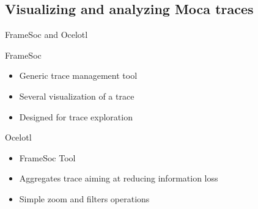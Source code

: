 \documentclass[xcolor={usenames,dvipsnames},hyperref={pdfusetitle}]{beamer}
\begin{document}
\subsection*{Visualizing and analyzing Moca traces}

\begin{frame}{FrameSoc and Ocelotl}
    \begin{block}{FrameSoc~\cite{Pagano14frameSoC}}
        \begin{itemize}
            \item Generic trace management tool
            \item Several visualization of a trace
            \item Designed for trace exploration
        \end{itemize}
    \end{block}
    \pause
    \begin{alertblock}{Ocelotl~\cite{Dosimont14Ocelotl}}
        \begin{itemize}
            \item FrameSoc Tool
            \item Aggregates trace aiming at reducing information loss
            \item Simple zoom and filters operations
        \end{itemize}
    \end{alertblock}
\end{frame}
\end{document}
